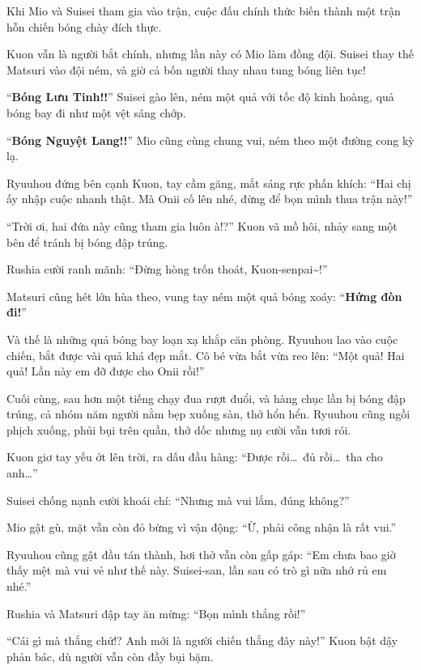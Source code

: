 \documentclass[../main.tex]{subfiles}
\begin{document}
\ct

Khi Mio và Suisei tham gia vào trận, cuộc đấu chính thức biến thành một trận hỗn chiến bóng chày đích thực.


Kuon vẫn là người bắt chính, nhưng lần này có Mio làm đồng đội. Suisei thay thế Matsuri vào đội ném, và giờ cả bốn người thay nhau tung bóng liên tục!

``\textbf{Bóng Lưu Tinh!!}'' Suisei gào lên, ném một quả với tốc độ kinh hoàng, quả bóng bay đi như một vệt sáng chớp.

``\textbf{Bóng Nguyệt Lang!!}'' Mio cũng cùng chung vui, ném theo một đường cong kỳ lạ.

Ryuuhou đứng bên cạnh Kuon, tay cầm găng, mắt sáng rực phấn khích: ``Hai chị ấy nhập cuộc nhanh thật. Mà Onii cố lên nhé, đừng để bọn mình thua trận này!''

``Trời ơi, hai đứa này cũng tham gia luôn à!?'' Kuon vã mồ hôi, nhảy sang một bên để tránh bị bóng đập trúng.

Rushia cười ranh mãnh: ``Đừng hòng trốn thoát, Kuon-senpai\~{}!''

Matsuri cũng hét lớn hùa theo, vung tay ném một quả bóng xoáy: ``\textbf{Hứng đòn đi!}''

Và thế là những quả bóng bay loạn xạ khắp căn phòng. Ryuuhou lao vào cuộc chiến, bắt được vài quả khá đẹp mắt. Cô bé vừa bắt vừa reo lên: ``Một quả! Hai quả! Lần này em đỡ được cho Onii rồi!''

Cuối cùng, sau hơn một tiếng chạy đua rượt đuổi, và hàng chục lần bị bóng đập trúng, cả nhóm năm người nằm bẹp xuống sàn, thở hổn hển. Ryuuhou cũng ngồi phịch xuống, phủi bụi trên quần, thở dốc nhưng nụ cười vẫn tươi rói.

Kuon giơ tay yếu ớt lên trời, ra dấu đầu hàng: ``Được rồi\dots\ đủ rồi\dots\ tha cho anh\dots''

Suisei chống nạnh cười khoái chí: ``Nhưng mà vui lắm, đúng không?''

Mio gật gù, mặt vẫn còn đỏ bừng vì vận động: ``Ừ, phải công nhận là rất vui.''

Ryuuhou cũng gật đầu tán thành, hơi thở vẫn còn gấp gáp: ``Em chưa bao giờ thấy mệt mà vui vẻ như thế này. Suisei-san, lần sau có trò gì nữa nhớ rủ em nhé.''

Rushia và Matsuri đập tay ăn mừng: ``Bọn mình thắng rồi!''

``Cái gì mà thắng chứ!? Anh mới là người chiến thắng đây này!'' Kuon bật dậy phản bác, dù người vẫn còn đầy bụi bặm.
\end{document}
